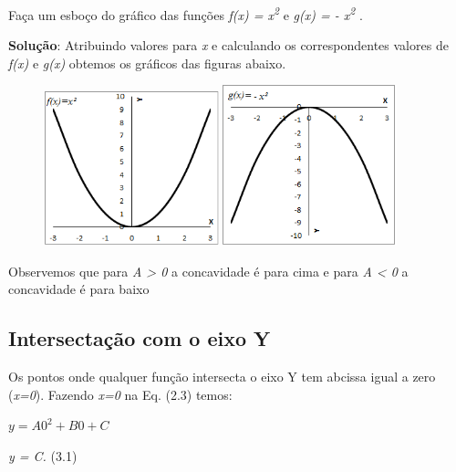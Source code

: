 \begin{texemplo}
Faça um esboço do gráfico das funções \textit{f(x) = x\textsuperscript{2} } e  \textit{g(x) = - x\textsuperscript{2} } . 

\textbf{Solução}: Atribuindo valores para \textit{x} e calculando os correspondentes valores de \textit{f(x)} e \textit{g(x)  }obtemos os gráficos das figuras abaixo.

\begin{figure}[H]
    \includegraphics[width=0.45\textwidth]{capitulos/funcao_do_segundo_grau/media/image3.png}

    \includegraphics[width=0.45\textwidth]{capitulos/funcao_do_segundo_grau/media/image4.png}
\end{figure}

Observemos que para  \textit{A > 0}   a concavidade é para cima e para \textit{A < 0}  a concavidade é para baixo\qedsymbol{}
\end{texemplo}

\subsection{Intersectação com o eixo Y}

Os pontos onde qualquer função intersecta o eixo Y tem abcissa igual a zero (\textit{x=0}). Fazendo \textit{x=0}  na Eq. (2.3) temos:

 \( y=A0^{2}+B0+C_{~ } \)

\textit{y = C.} \tab (3.1)

